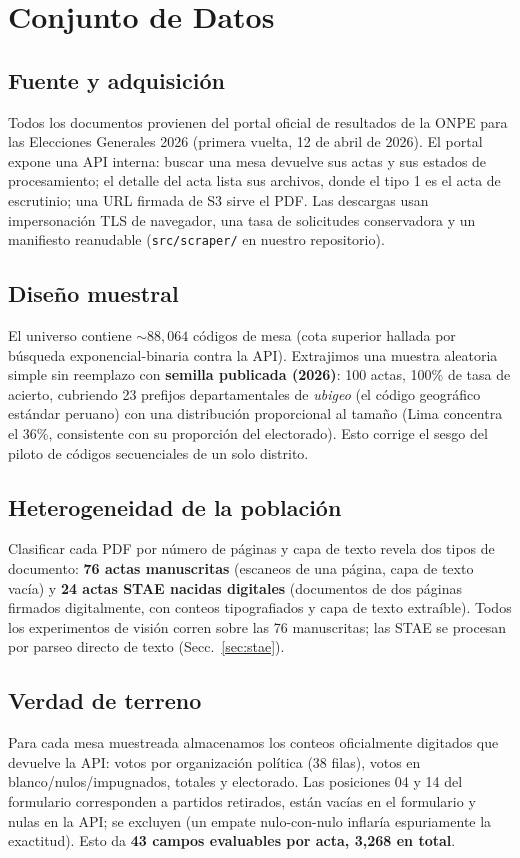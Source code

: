 \documentclass[conference]{IEEEtran}
\begin{document}
\section{Conjunto de Datos}
\subsection{Fuente y adquisici\'on}
Todos los documentos provienen del portal oficial de resultados de la ONPE
para las Elecciones Generales 2026 (primera vuelta, 12 de abril de 2026). El
portal expone una API interna: buscar una mesa devuelve sus actas y sus
estados de procesamiento; el detalle del acta lista sus archivos, donde el
tipo 1 es el acta de escrutinio; una URL firmada de S3 sirve el PDF. Las
descargas usan impersonaci\'on TLS de navegador, una tasa de solicitudes
conservadora y un manifiesto reanudable (\texttt{src/scraper/} en nuestro
repositorio).

\subsection{Dise\~no muestral}
El universo contiene ${\sim}88{,}064$ c\'odigos de mesa (cota superior
hallada por b\'usqueda exponencial-binaria contra la API). Extrajimos una
muestra aleatoria simple sin reemplazo con \textbf{semilla publicada (2026)}:
100 actas, 100\% de tasa de acierto, cubriendo 23 prefijos departamentales de
\emph{ubigeo} (el c\'odigo geogr\'afico est\'andar peruano) con una
distribuci\'on proporcional al tama\~no (Lima concentra el 36\%, consistente
con su proporci\'on del electorado). Esto corrige el sesgo del piloto de
c\'odigos secuenciales de un solo distrito.

\subsection{Heterogeneidad de la poblaci\'on}
Clasificar cada PDF por n\'umero de p\'aginas y capa de texto revela dos
tipos de documento: \textbf{76 actas manuscritas} (escaneos de una p\'agina,
capa de texto vac\'ia) y \textbf{24 actas STAE nacidas digitales} (documentos
de dos p\'aginas firmados digitalmente, con conteos tipografiados y capa de
texto extra\'ible). Todos los experimentos de visi\'on corren sobre las 76
manuscritas; las STAE se procesan por parseo directo de texto
(Secc.~\ref{sec:stae}).

\subsection{Verdad de terreno}
Para cada mesa muestreada almacenamos los conteos oficialmente digitados que
devuelve la API: votos por organizaci\'on pol\'itica (38 filas), votos en
blanco/nulos/impugnados, totales y electorado. Las posiciones 04 y 14 del
formulario corresponden a partidos retirados, est\'an vac\'ias en el
formulario y nulas en la API; se excluyen (un empate nulo-con-nulo inflar\'ia
espuriamente la exactitud). Esto da \textbf{43 campos evaluables por acta,
3,268 en total}.
\end{document}
